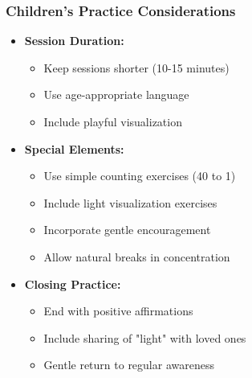 \begin{frame}[fragile]\frametitle{Children's Practice Considerations}
    \begin{itemize}
        \item \textbf{Session Duration:}
        \begin{itemize}
            \item Keep sessions shorter (10-15 minutes)
            \item Use age-appropriate language
            \item Include playful visualization
        \end{itemize}
        \item \textbf{Special Elements:}
        \begin{itemize}
            \item Use simple counting exercises (40 to 1)
            \item Include light visualization exercises
            \item Incorporate gentle encouragement
            \item Allow natural breaks in concentration
        \end{itemize}
        \item \textbf{Closing Practice:}
        \begin{itemize}
            \item End with positive affirmations
            \item Include sharing of "light" with loved ones
            \item Gentle return to regular awareness
        \end{itemize}
    \end{itemize}
\end{frame}